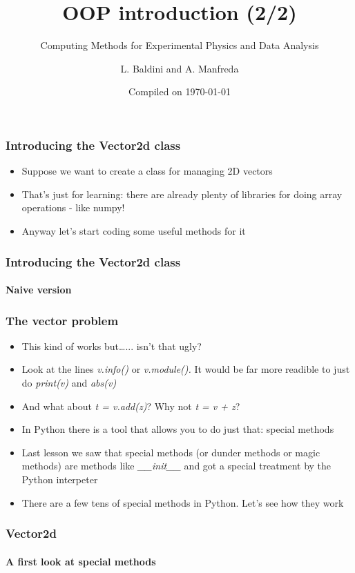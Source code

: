 \documentclass[9pt]{beamer}
\title{OOP introduction (2/2)}
\subtitle{Computing Methods for Experimental Physics and Data Analysis}
\date{Compiled on \today}
\author{L. Baldini and A. Manfreda}
\institute[INFN]{INFN--Pisa}
\begin{document}
\titleframe


\begin{frame}
  \frametitle{Introducing the Vector2d class}

  \begin{itemize}
    \item Suppose we want to create a class for managing 2D vectors
    \bigskip
    \item That's just for learning: there are already plenty of libraries for
          doing array operations - like numpy!
    \bigskip
    \item Anyway let's start coding some useful methods for it
  \end{itemize}

\end{frame}


\begin{frame}
  \frametitle{Introducing the Vector2d class}
  \framesubtitle{Naive version}
  
\end{frame}


\begin{frame}
  \frametitle{The vector problem}

  \begin{itemize}
    \item This kind of works but\dots... isn't that ugly?
    \medskip
    \item Look at the lines \emph{v.info()} or \emph{v.module().}
          It would be far more readible to just do \emph{print(v)} and \emph{abs(v)}
    \medskip
    \item And what about \emph{t = v.add(z)}? Why not \emph{t = v + z}?
    \medskip
    \item In Python there is a tool that allows you to do just that: \alert{special methods}
    \medskip
    \item Last lesson we saw that special methods (or dunder methods or
          magic methods) are methods like \emph{\_\_init\_\_} and got a special
          treatment by the Python interpeter
    \medskip
    \item There are a few tens of special methods in Python. Let's see how they work
  \end{itemize}

\end{frame}


\begin{frame}
  \frametitle{Vector2d}
  \framesubtitle{A first look at special methods}
  
\end{frame}
\end{document}
